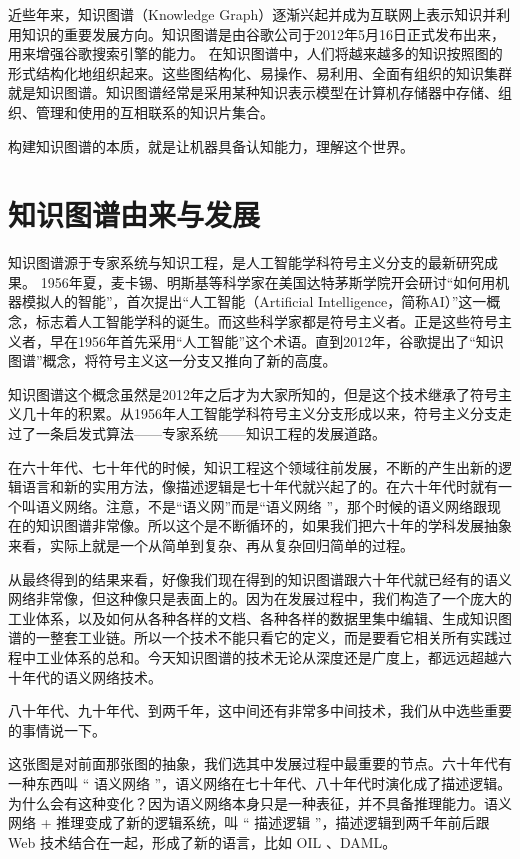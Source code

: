 近些年来，知识图谱（Knowledge Graph）逐渐兴起并成为互联网上表示知识并利用知识的重要发展方向。知识图谱是由谷歌公司于2012年5月16日正式发布出来，用来增强谷歌搜索引擎的能力\cite{url:KnowledgeGraphDef}。
在知识图谱中，人们将越来越多的知识按照图的形式结构化地组织起来。这些图结构化、易操作、易利用、全面有组织的知识集群就是知识图谱。知识图谱经常是采用某种知识表示模型在计算机存储器中存储、组织、管理和使用的互相联系的知识片集合。

构建知识图谱的本质，就是让机器具备认知能力，理解这个世界。

\section{知识图谱由来与发展}
知识图谱源于专家系统与知识工程，是人工智能学科符号主义分支的最新研究成果。
1956年夏，麦卡锡、明斯基等科学家在美国达特茅斯学院开会研讨“如何用机器模拟人的智能”，首次提出“人工智能（Artificial Intelligence，简称AI）”这一概念，标志着人工智能学科的诞生。而这些科学家都是符号主义者。正是这些符号主义者，早在1956年首先采用“人工智能”这个术语。直到2012年，谷歌提出了“知识图谱”概念，将符号主义这一分支又推向了新的高度。

知识图谱这个概念虽然是2012年之后才为大家所知的，但是这个技术继承了符号主义几十年的积累。从1956年人工智能学科符号主义分支形成以来，符号主义分支走过了一条启发式算法——专家系统——知识工程的发展道路。

在六十年代、七十年代的时候，知识工程这个领域往前发展，不断的产生出新的逻辑语言和新的实用方法，像描述逻辑是七十年代就兴起了的。在六十年代时就有一个叫语义网络。注意，不是“语义网”而是“语义网络 ”，那个时候的语义网络跟现在的知识图谱非常像。所以这个是不断循环的，如果我们把六十年的学科发展抽象来看，实际上就是一个从简单到复杂、再从复杂回归简单的过程。

从最终得到的结果来看，好像我们现在得到的知识图谱跟六十年代就已经有的语义网络非常像，但这种像只是表面上的。因为在发展过程中，我们构造了一个庞大的工业体系，以及如何从各种各样的文档、各种各样的数据里集中编辑、生成知识图谱的一整套工业链。所以一个技术不能只看它的定义，而是要看它相关所有实践过程中工业体系的总和。今天知识图谱的技术无论从深度还是广度上，都远远超越六十年代的语义网络技术。

八十年代、九十年代、到两千年，这中间还有非常多中间技术，我们从中选些重要的事情说一下。

这张图是对前面那张图的抽象，我们选其中发展过程中最重要的节点。六十年代有一种东西叫 “ 语义网络 ”，语义网络在七十年代、八十年代时演化成了描述逻辑。为什么会有这种变化？因为语义网络本身只是一种表征，并不具备推理能力。语义网络 + 推理变成了新的逻辑系统，叫 “ 描述逻辑 ”，描述逻辑到两千年前后跟 Web 技术结合在一起，形成了新的语言，比如 OIL 、DAML。

